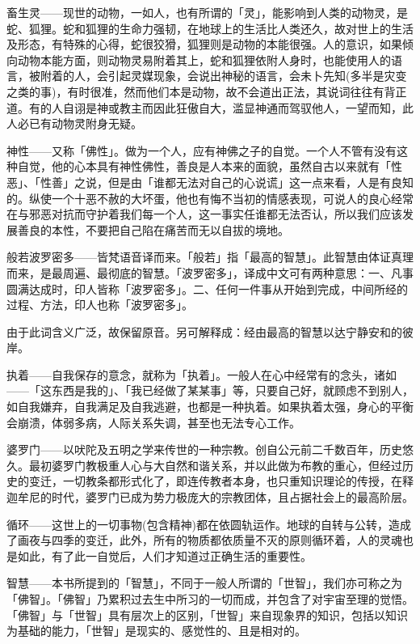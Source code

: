 \documentclass[twoside,openany]{book}
\begin{document}
\textbullet 畜生灵——现世的动物，一如人，也有所谓的「灵」，能影响到人类的动物灵，是蛇、狐狸。蛇和狐狸的生命力强韧，在地球上的生活比人类还久，故对世上的生活及形态，有特殊的心得，蛇很狡猾，狐狸则是动物的本能很强。人的意识，如果倾向动物本能方面，则动物灵易附着其上，蛇和狐狸依附人身时，也能使用人的语言，被附着的人，会引起灵媒现象，会说出神秘的语言，会未卜先知(多半是灾变之类的事)，有时很准，然而他们本是动物，故不会道出正法，其说词往往有背正道。有的人自诩是神或教主而因此狂傲自大，滥显神通而驾驭他人，一望而知，此人必已有动物灵附身无疑。

\textbullet 神性——又称「佛性」。做为一个人，应有神佛之子的自觉。一个人不管有没有这种自觉，他的心本具有神性佛性，善良是人本来的面貌，虽然自古以来就有「性恶」、「性善」之说，但是由「谁都无法对自己的心说谎」这一点来看，人是有良知的。纵使一个十恶不赦的大坏蛋，他也有悔不当初的情感表现，可说人的良心经常在与邪恶对抗而守护着我们每一个人，这一事实任谁都无法否认，所以我们应该发展善良的本性，不要把自己陷在痛苦而无以自拔的境地。

\textbullet 般若波罗密多——皆梵语音译而来。「般若」指「最高的智慧」。此智慧由体证真理而来，是最周遍、最彻底的智慧。「波罗密多」，译成中文可有两种意思：一、凡事圆满达成时，印人皆称「波罗密多」。二、任何一件事从开始到完成，中间所经的过程、方法，印人也称「波罗密多」。

由于此词含义广泛，故保留原音。另可解释成：经由最高的智慧以达宁静安和的彼岸。

\textbullet 执着——自我保存的意念，就称为「执着」。一般人在心中经常有的念头，诸如——「这东西是我的」、「我已经做了某某事」等，只要自己好，就顾虑不到别人，如自我嫌弃，自我满足及自我逃避，也都是一种执着。如果执着太强，身心的平衡会崩溃，体弱多病，人际关系失调，甚至也无法专心工作。

\textbullet 婆罗门——以吠陀及五明之学来传世的一种宗教。创自公元前二千数百年，历史悠久。最初婆罗门教极重人心与大自然和谐关系，并以此做为布教的重心，但经过历史的变迁，一切教条都形式化了，即连传教者本身，也只重知识理论的传授，在释迦牟尼的时代，婆罗门已成为势力极庞大的宗教团体，且占据社会上的最高阶层。

\textbullet 循环——这世上的一切事物(包含精神)都在依圆轨运作。地球的自转与公转，造成了画夜与四季的变迁，此外，所有的物质都依质量不灭的原则循环着，人的灵魂也是如此，有了此一自觉后，人们才知道过正确生活的重要性。

\textbullet 智慧——本书所提到的「智慧」，不同于一般人所谓的「世智」，我们亦可称之为「佛智」。「佛智」乃累积过去生中所习的一切而成，并包含了对宇宙至理的觉悟。「佛智」与「世智」具有层次上的区别，「世智」来自现象界的知识，包括以知识为基础的能力，「世智」是现实的、感觉性的、且是相对的。
\end{document}
